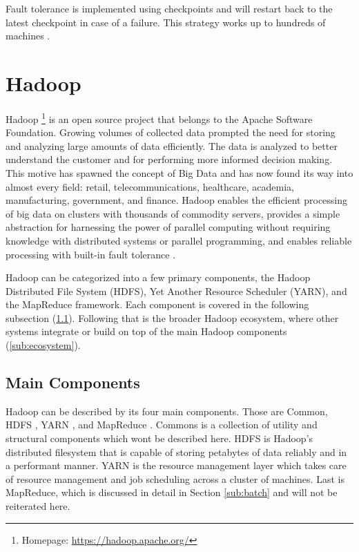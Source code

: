 \documentclass[12pt]{article}
\begin{document}
Fault tolerance is implemented using checkpoints and will restart back to the latest checkpoint in case of a failure. This strategy works up to hundreds of machines \cite{xing2015petuum}.





\section{Hadoop} \label{sec:hadoop}

Hadoop \footnote{Homepage: \url{https://hadoop.apache.org/}} is an open source project that belongs to the Apache Software Foundation. Growing volumes of collected data prompted the need for storing and analyzing large amounts of data efficiently. The data is analyzed to better understand the customer and for performing more informed decision making. This motive has spawned the concept of Big Data and has now found its way into almost every field: retail, telecommunications, healthcare, academia, manufacturing, government, and finance. Hadoop enables the efficient processing of big data on clusters with thousands of commodity servers, provides a simple abstraction for harnessing the power of parallel computing without requiring knowledge with distributed systems or parallel programming, and enables reliable processing with built-in fault tolerance \cite{zhang2016survey,singh2015survey}.

Hadoop can be categorized into a few primary components, the Hadoop Distributed File System (HDFS), Yet Another Resource Scheduler (YARN), and the MapReduce framework. Each component is covered in the following subsection (\ref{sub:components}). Following that is the broader Hadoop ecosystem, where other systems integrate or build on top of the main Hadoop components (\ref{sub:ecosystem}).



\subsection{Main Components} \label{sub:components}

Hadoop can be described by its four main components. Those are Common, HDFS \cite{hdfs}, YARN \cite{yarn}, and MapReduce \cite{dean2008mapreduce}. Commons is a collection of utility and structural components which wont be described here. HDFS is Hadoop's distributed filesystem that is capable of storing petabytes of data reliably and in a performant manner. YARN is the resource management layer which takes care of resource management and job scheduling across a cluster of machines. Last is MapReduce, which is discussed in detail in Section \ref{sub:batch} and will not be reiterated here.
\end{document}
